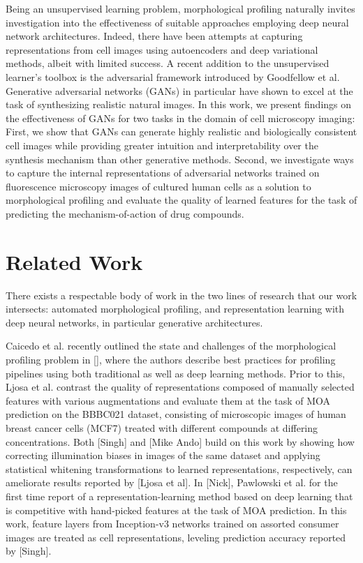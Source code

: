 \documentclass{article}
\begin{document}
Being an unsupervised learning problem, morphological profiling naturally invites investigation into the effectiveness of suitable approaches employing deep neural network architectures. Indeed, there have been attempts at capturing representations from cell images using autoencoders and deep variational methods, albeit with limited success. A recent addition to the unsupervised learner's toolbox is the adversarial framework introduced by Goodfellow et al. Generative adversarial networks (GANs) in particular have shown to excel at the task of synthesizing realistic natural images. In this work, we present findings on the effectiveness of GANs for two tasks in the domain of cell microscopy imaging: First, we show that GANs can generate highly realistic and biologically consistent cell images while providing greater intuition and interpretability over the synthesis mechanism than other generative methods. Second, we investigate ways to capture the internal representations of adversarial networks trained on fluorescence microscopy images of cultured human cells as a solution to morphological profiling and evaluate the quality of learned features for the task of predicting the mechanism-of-action of drug compounds.

\section{Related Work}

There exists a respectable body of work in the two lines of research that our work intersects: automated morphological profiling, and representation learning with deep neural networks, in particular generative architectures.

Caicedo et al. recently outlined the state and challenges of the morphological profiling problem in [], where the authors describe best practices for profiling pipelines using both traditional as well as deep learning methods. Prior to this, Ljosa et al. contrast the quality of representations composed of manually selected features with various augmentations and evaluate them at the task of MOA prediction on the BBBC021 dataset, consisting of microscopic images of human breast cancer cells (MCF7) treated with different compounds at differing concentrations. Both [Singh] and [Mike Ando] build on this work by showing how correcting illumination biases in images of the same dataset and applying statistical whitening transformations to learned representations, respectively, can ameliorate results reported by [Ljosa et al]. In [Nick], Pawlowski et al. for the first time report of a representation-learning method based on deep learning that is competitive with hand-picked features at the task of MOA prediction. In this work, feature layers from Inception-v3 networks trained on assorted consumer images are treated as cell representations, leveling prediction accuracy reported by [Singh].
\end{document}
